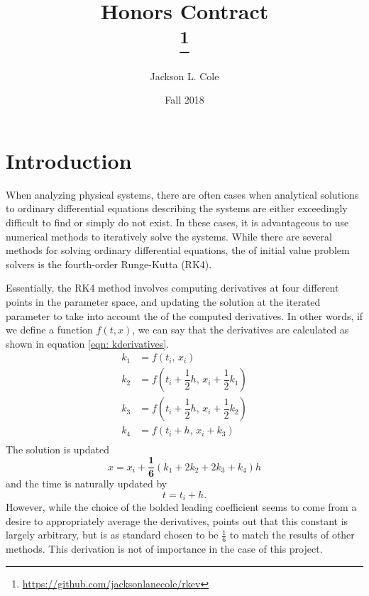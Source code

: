 \documentclass[onecolumn,titlepage,letterpaper,10pt]{article}
\title{Honors Contract\\
\large \theWorkingTitle\thanks{\url{https://github.com/jacksonlanecole/rkev}}}
\author{Jackson L. Cole}
\affil{Department of Physics and Astronomy, Middle Tennessee State University}
\date{Fall 2018}
\newcommand{\functionof}[2]{#1\left(#2\right)}
\newcommand{\paren}[1]{\left(#1\right)}
\begin{document}

\maketitle
\tableofcontents
\listoffigures
\doublespacing

\section{Introduction}
When analyzing physical systems, there are often cases when analytical
solutions to ordinary differential equations describing the systems
are either exceedingly difficult to find or simply do not exist.
In these cases, it is advantageous to use numerical methods to
iteratively solve the systems. While there are several methods for solving ordinary
differential equations, the  of initial value problem solvers is
the fourth-order Runge-Kutta (RK4). \cite{holmes_2018}

Essentially, the RK4 method involves computing derivatives at
four different points in the parameter space, and updating the solution at the
iterated parameter to take into account the 
of the computed
derivatives. In other words, if we define a function $\functionof{f}{t, x}$, we
can say that the derivatives are calculated as shown in equation \eqref{eqn:
kderivatives}.
\begin{equation}
\begin{aligned}
    k_1 &= \functionof{f}{t_i,\, x_i}\\
    k_2 &= \functionof{f}{t_i + \dfrac{1}{2}h,\, x_i + \dfrac{1}{2}k_1}\\
    k_3 &= \functionof{f}{t_i + \dfrac{1}{2}h,\, x_i + \dfrac{1}{2}k_2}\\
    k_4 &= \functionof{f}{       t_i + h,\,        x_i + k_3}\\
    \label{eqn: kderivatives}
\end{aligned}
\end{equation}
The solution is updated
\begin{equation}
    x   = x_i + \mathbf{\dfrac{1}{6}}\paren{k_1 + 2k_2 + 2k_3 + k_4}h
\end{equation}
and the time is naturally updated by
\begin{equation}
    \label{eqn: time update}
    t = t_i + h.
\end{equation}
However, while the choice of the bolded leading coefficient seems to come
from a desire to
appropriately average the derivatives, \citet{holmes_2018} points out that
this constant is largely arbitrary, but is as standard chosen to be
$\frac{1}{6}$ to match the results of other methods. This derivation is not of
importance in the case of this project.
\end{document}
